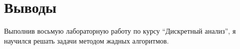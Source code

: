\section{Выводы}

Выполнив восьмую лабораторную работу по курсу \enquote{Дискретный анализ}, я научился решать задачи методом жадных алгоритмов.

\pagebreak
